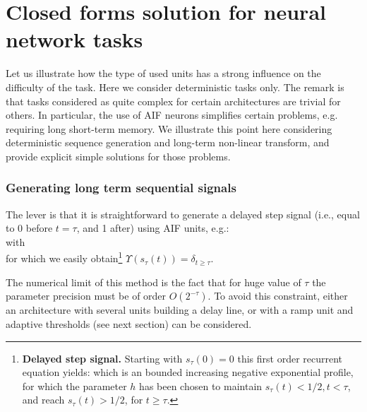 \section{Closed forms solution for neural network tasks} \label{closedforms}

Let us illustrate how the type of used units has a strong influence on the difficulty of the task. Here we consider deterministic tasks only. The remark is that tasks considered as quite complex \cite{Hochreiter:1997,Gers:2003,martens_learning_2016} for certain architectures are trivial for others. In particular, the use of AIF neurons simplifies certain problems, e.g. requiring long short-term memory. We illustrate this point here considering deterministic sequence generation and long-term non-linear transform, and provide explicit simple solutions for those problems.

\subsubsection*{Generating long term sequential signals}

The lever is that it is straightforward to generate a delayed step signal (i.e., equal to 0 before $t=\tau$, and 1 after) using AIF units, e.g.:
\\
with 
\\  
for which we easily obtain\footnote{{\bf Delayed step signal.} Starting with $s_\tau(0) = 0$ this first order recurrent equation yields: 
which is an bounded increasing negative exponential profile, for which the parameter $h$ has been chosen to maintain $s_\tau(t) < 1/2, t < \tau$, and reach $s_\tau(t) > 1/2$, for $t \geq \tau$.
\hr} $\Upsilon(s_\tau(t)) = \delta_{t\geq\tau}$. 

The numerical limit of this method is the fact that for huge value of $\tau$ the parameter precision must be of order $O\left(2^{-\tau}\right)$. To avoid this constraint, either an architecture with several units building a delay line, or with a ramp unit and adaptive thresholds (see next section) can be considered.

